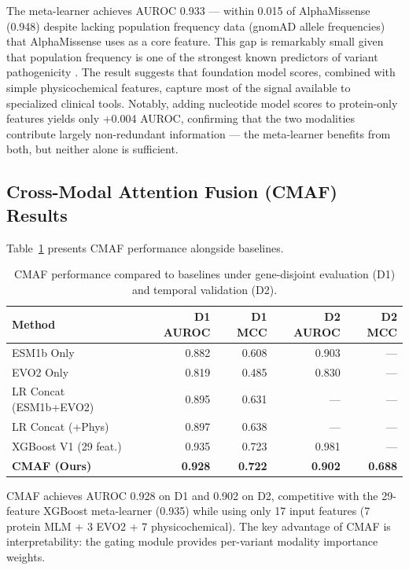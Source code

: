 \documentclass[9pt]{article}
\begin{document}
The meta-learner achieves AUROC 0.933 --- within 0.015 of AlphaMissense (0.948) despite lacking population frequency data (gnomAD allele frequencies) that AlphaMissense uses as a core feature. This gap is remarkably small given that population frequency is one of the strongest known predictors of variant pathogenicity \cite{ioannidis2016revel}. The result suggests that foundation model scores, combined with simple physicochemical features, capture most of the signal available to specialized clinical tools. Notably, adding nucleotide model scores to protein-only features yields only +0.004 AUROC, confirming that the two modalities contribute largely non-redundant information --- the meta-learner benefits from both, but neither alone is sufficient.

\subsection{Cross-Modal Attention Fusion (CMAF) Results}

Table~\ref{tab:cmaf_results} presents CMAF performance alongside baselines.

\begin{table}[h]
\centering
\caption{CMAF performance compared to baselines under gene-disjoint evaluation (D1) and temporal validation (D2).}
\label{tab:cmaf_results}
\small
\begin{tabular}{lrrrr}
\toprule
\textbf{Method} & \textbf{D1 AUROC} & \textbf{D1 MCC} & \textbf{D2 AUROC} & \textbf{D2 MCC} \\
\midrule
ESM1b Only & 0.882 & 0.608 & 0.903 & --- \\
EVO2 Only & 0.819 & 0.485 & 0.830 & --- \\
LR Concat (ESM1b+EVO2) & 0.895 & 0.631 & --- & --- \\
LR Concat (+Phys) & 0.897 & 0.638 & --- & --- \\
XGBoost V1 (29 feat.) & 0.935 & 0.723 & 0.981 & --- \\
\midrule
\textbf{CMAF (Ours)} & \textbf{0.928} & \textbf{0.722} & \textbf{0.902} & \textbf{0.688} \\
\bottomrule
\end{tabular}
\end{table}

CMAF achieves AUROC 0.928 on D1 and 0.902 on D2, competitive with the 29-feature XGBoost meta-learner (0.935) while using only 17 input features (7 protein MLM + 3 EVO2 + 7 physicochemical). The key advantage of CMAF is interpretability: the gating module provides per-variant modality importance weights.
\end{document}
